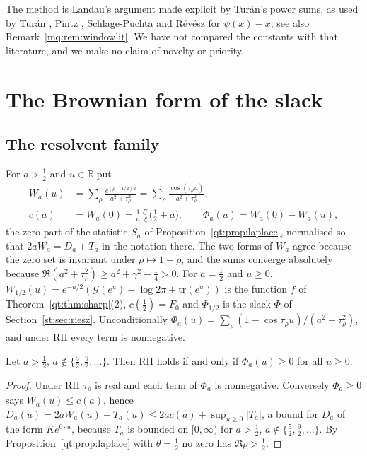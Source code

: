 \begin{remark}[Literature]\label{mq:rem:zfblit}
The method is Landau's argument made explicit by Tur\'an's power sums, as used by Tur\'an \cite{Turan50}, Pintz \cite{Pintz80}, Schlage-Puchta \cite{SchlagePuchta} and R\'ev\'esz \cite{Revesz23} for $\psi(x)-x$; see also Remark~\ref{mq:rem:windowlit}. We have not compared the constants with that literature, and we make no claim of novelty or priority.
\end{remark}

\section{The Brownian form of the slack}\label{mq:sec:brownian}

\subsection{The resolvent family}

For $a>\frac12$ and $u\in\mathbb R$ put
\begin{align*}
W_a(u)&=\sum_\rho\frac{e^{(\rho-1/2)u}}{a^2+\tau_\rho^2}=\sum_\rho\frac{\cos(\tau_\rho u)}{a^2+\tau_\rho^2},\\
c(a)&=W_a(0)=\frac1a\,\frac{\xi'}{\xi}\Big(\frac12+a\Big),\qquad\Phi_a(u)=W_a(0)-W_a(u),
\end{align*}
the zero part of the statistic $S_a$ of Proposition~\ref{qt:prop:laplace}, normalised so that $2aW_a=D_a+T_a$ in the notation there. The two forms of $W_a$ agree because the zero set is invariant under $\rho\mapsto1-\rho$, and the sums converge absolutely because $\Re(a^2+\tau_\rho^2)\ge a^2+\gamma^2-\frac14>0$. For $a=\frac12$ and $u\ge0$, $W_{1/2}(u)=e^{-u/2}(\mathcal G(e^u)-\log2\pi+\mathrm{tr}(e^u))$ is the function $f$ of Theorem~\ref{qt:thm:sharp}(2), $c(\frac12)=F_0$ and $\Phi_{1/2}$ is the slack $\Phi$ of Section~\ref{st:sec:riesz}. Unconditionally $\Phi_a(u)=\sum_\rho(1-\cos\tau_\rho u)/(a^2+\tau_\rho^2)$, and under RH every term is nonnegative.

\begin{proposition}\label{mq:prop:crit}
Let $a>\frac12$, $a\notin\{\frac52,\frac92,\dots\}$. Then RH holds if and only if $\Phi_a(u)\ge0$ for all $u\ge0$.
\end{proposition}

\begin{proof}
Under RH $\tau_\rho$ is real and each term of $\Phi_a$ is nonnegative. Conversely $\Phi_a\ge0$ says $W_a(u)\le c(a)$, hence $D_a(u)=2aW_a(u)-T_a(u)\le2ac(a)+\sup_{u\ge0}|T_a|$, a bound for $D_a$ of the form $Ke^{0\cdot u}$, because $T_a$ is bounded on $[0,\infty)$ for $a>\frac12$, $a\notin\{\frac52,\frac92,\dots\}$. By Proposition~\ref{qt:prop:laplace} with $\theta=\frac12$ no zero has $\Re\rho>\frac12$.
\end{proof}


